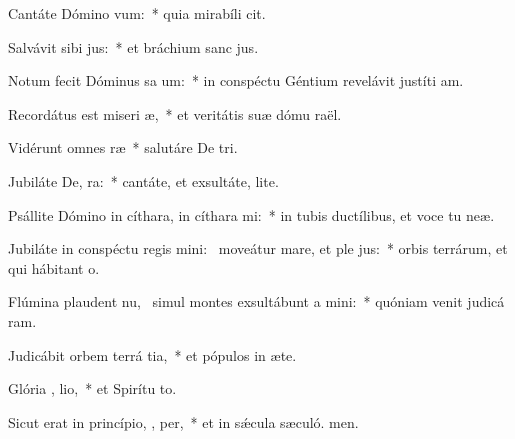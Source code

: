 \item Cantáte Dómino  vum:~* quia mirabíli cit.
\item Salvávit sibi  jus:~* et bráchium sanc jus.
\item Notum fecit Dóminus sa um:~* in conspéctu Géntium revelávit justíti am.
\item Recordátus est miseri æ,~* et veritátis suæ dómu raël.
\item Vidérunt omnes  ræ~* salutáre De tri.
\item Jubiláte De,  ra:~* cantáte, et exsultáte,  lite.
\item Psállite Dómino in cíthara, in cíthara   mi:~* in tubis ductílibus, et voce tu neæ.
\item Jubiláte in conspéctu regis mini:~\pscross{} moveátur mare, et ple jus:~* orbis terrárum, et qui hábitant  o.
\item Flúmina plaudent nu,~\pscross{} simul montes exsultábunt a  mini:~* quóniam venit judicá ram.
\item Judicábit orbem terrá  tia,~* et pópulos in æte.
\item Glória ,  lio,~* et Spirítu to.
\item Sicut erat in princípio,  ,  per,~* et in sǽcula sæculó. men.
